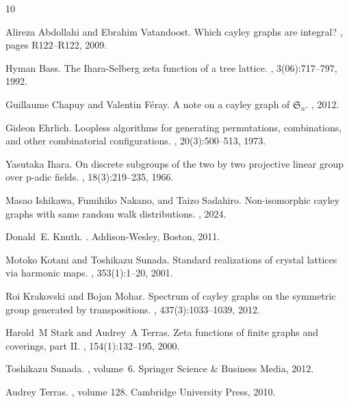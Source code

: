 \documentclass[lualatex,12pt]{article}
\begin{document}
%
%

\begin{thebibliography}{10}

Alireza Abdollahi and Ebrahim Vatandoost.
\newblock Which cayley graphs are integral?
, pages
  R122--R122, 2009.

Hyman Bass.
\newblock The {I}hara-{S}elberg zeta function of a tree lattice.
, 3(06):717--797, 1992.

Guillaume Chapuy and Valentin F{\'e}ray.
\newblock A note on a cayley graph of {${\mathfrak S}_n$}.
, 2012.

Gideon Ehrlich.
\newblock Loopless algorithms for generating permutations, combinations, and
  other combinatorial configurations.
, 20(3):500--513, 1973.

Yasutaka Ihara.
\newblock On discrete subgroups of the two by two projective linear group over
  p-adic fields.
, 18(3):219--235,
  1966.

Masao Ishikawa, Fumihiko Nakano, and Taizo Sadahiro.
\newblock Non-isomorphic cayley graphs with same random walk distributions.
, 2024.

Donald~E. Knuth.
.
\newblock Addison-Wesley, Boston, 2011.

Motoko Kotani and Toshikazu Sunada.
\newblock Standard realizations of crystal lattices via harmonic maps.
,
  353(1):1--20, 2001.

Roi Krakovski and Bojan Mohar.
\newblock Spectrum of cayley graphs on the symmetric group generated by
  transpositions.
, 437(3):1033--1039, 2012.

Harold~M Stark and Audrey~A Terras.
\newblock Zeta functions of finite graphs and coverings, part {II}.
, 154(1):132--195, 2000.

Toshikazu Sunada.
, volume~6.
\newblock Springer Science \& Business Media, 2012.

Audrey Terras.
, volume
  128.
\newblock Cambridge University Press, 2010.

\end{thebibliography}
\end{document}
